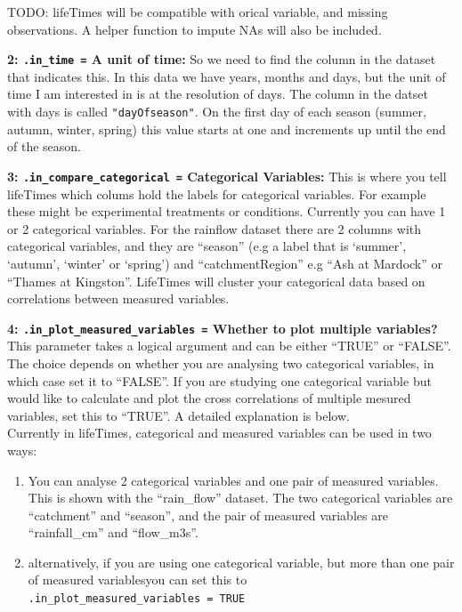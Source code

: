 \documentclass[
]{article}
\providecommand{\tightlist}{%
  \setlength{\itemsep}{0pt}\setlength{\parskip}{0pt}}
\begin{document}
TODO: lifeTimes will be compatible with orical variable, and missing
observations. A helper function to impute NAs will also be included.

\textbf{2: \texttt{.in\_time\ =} A unit of time:} So we need to find the
column in the dataset that indicates this. In this data we have years,
months and days, but the unit of time I am interested in is at the
resolution of days. The column in the datset with days is called
\texttt{"dayOfseason"}. On the first day of each season (summer, autumn,
winter, spring) this value starts at one and increments up until the end
of the season.

\textbf{3: \texttt{.in\_compare\_categorical\ =} Categorical Variables:}
This is where you tell lifeTimes which colums hold the labels for
categorical variables. For example these might be experimental
treatments or conditions. Currently you can have 1 or 2 categorical
variables. For the rainflow dataset there are 2 columns with categorical
variables, and they are ``season'' (e.g a label that is `summer',
`autumn', `winter' or `spring') and ``catchmentRegion'' e.g ``Ash at
Mardock'' or ``Thames at Kingston''. LifeTimes will cluster your
categorical data based on correlations between measured variables.

\textbf{4: \texttt{.in\_plot\_measured\_variables\ =} Whether to plot
multiple variables?} This parameter takes a logical argument and can be
either ``TRUE'' or ``FALSE''. The choice depends on whether you are
analysing two categorical variables, in which case set it to ``FALSE''.
If you are studying one categorical variable but would like to calculate
and plot the cross correlations of multiple mesured variables, set this
to ``TRUE''. A detailed explanation is below.\\

Currently in lifeTimes, categorical and measured variables can be used
in two ways:\\

\begin{enumerate}
\def\labelenumi{\roman{enumi}.}
\tightlist
\item
  You can analyse 2 categorical variables and one pair of measured
  variables. This is shown with the ``rain\_flow'' dataset. The two
  categorical variables are ``catchment'' and ``season'', and the pair
  of measured variables are ``rainfall\_cm'' and ``flow\_m3s''.\\
\item
  alternatively, if you are using one categorical variable, but more
  than one pair of measured variablesyou can set this to
  \texttt{.in\_plot\_measured\_variables\ =\ TRUE}
\end{enumerate}
\end{document}
